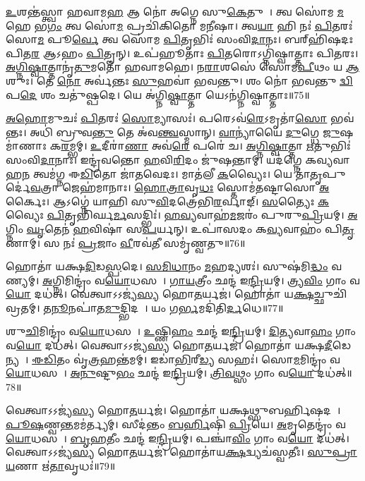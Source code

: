 \ul{𑌉}𑌶𑌨𑍍𑌤॑𑌸𑍍𑌤𑍍𑌵𑌾 𑌹𑌵𑌾𑌮\ul{𑌹} 𑌆 𑌨𑍋॑ 𑌅𑌗𑍍𑌨𑍇 𑌸𑍁\ul{𑌕𑍇}𑌤𑍁𑌨𑌾᳚।
𑌤𑍍𑌵 𑌸𑍋॑𑌮 \ul{𑌮}𑌹𑍇 𑌭\ul{𑌗𑌂} 𑌤𑍍𑌵 𑌸𑍋॑\ul{𑌮} 𑌪𑍍𑌰𑌚𑌿॑𑌕𑌿𑌤𑍋 𑌮\ul{𑌨𑍀}𑌷𑌾।
𑌤𑍍𑌵\ul{𑌯𑌾} 𑌹𑌿 𑌨𑌃॑ \ul{𑌪𑌿}𑌤𑌰𑌃॑ 𑌸𑍋\ul{𑌮} 𑌪𑍂\ul{𑌰𑍍𑌵𑍇} 𑌤𑍍𑌵 𑌸𑍋॑𑌮 \ul{𑌪𑌿}𑌤𑍃𑌭𑌿𑌃॑ 𑌸𑌂𑌵𑌿\ul{𑌦𑌾}𑌨𑌃।
𑌬𑌰𑍍‌\mbox{}𑌹𑌿॑𑌷𑌦𑌃 𑌪𑌿𑌤\ul{𑌰} 𑌆𑌽𑌹𑌂 \ul{𑌪𑌿}𑌤𑍄𑌨𑍍।
𑌉𑌪॑𑌹𑍂𑌤𑌾𑌃 \ul{𑌪𑌿}𑌤𑌰𑍋\-𑌽𑌗𑍍𑌨𑌿॑𑌷𑍍𑌵𑌾𑌤𑍍𑌤𑌾𑌃 𑌪𑌿𑌤𑌰𑌃।
\ul{𑌅}\ul{𑌗𑍍𑌨𑌿}\ul{𑌷𑍍𑌵𑌾}𑌤𑍍𑌤𑌾𑌨𑍃॑\ul{𑌤𑍁}𑌮𑌤𑍋॑ 𑌹𑌵𑌾𑌮𑌹𑍇।
𑌨\ul{𑌰𑌾}𑌶𑌸𑍇॑ 𑌸𑍋𑌮\ul{𑌪𑍀}𑌥𑌂 𑌯 \ul{𑌆}𑌶𑍁𑌃।
𑌤𑍇 \ul{𑌨𑍋} 𑌅𑌰𑍍𑌵॑𑌨𑍍𑌤𑌃 \ul{𑌸𑍁}𑌹𑌵𑌾॑ 𑌭𑌵𑌨𑍍𑌤𑍁।
𑌶𑌂 𑌨𑍋॑ 𑌭𑌵𑌨𑍍𑌤𑍁 \ul{𑌦𑍍𑌵𑌿}𑌪\ul{𑌦𑍇} 𑌶𑌂 𑌚𑌤𑍁॑𑌷𑍍𑌪𑌦𑍇।
𑌯𑍇 𑌅॑𑌗𑍍𑌨𑌿\ul{𑌷𑍍𑌵𑌾}𑌤𑍍𑌤𑌾 𑌯𑍇𑌽𑌨॑𑌗𑍍𑌨𑌿𑌷𑍍𑌵𑌾𑌤𑍍𑌤𑌾𑌃॥75॥

\ul{𑌅}\ul{}\ul{𑌹𑍋}𑌮𑍁𑌚𑌃॑ \ul{𑌪𑌿}𑌤𑌰𑌃॑ \ul{𑌸𑍋}𑌮𑍍𑌯𑌾𑌸𑌃॑।
𑌪𑌰𑍇𑌽𑌵॑\ul{𑌰𑍇}\-𑌽𑌮𑍃𑌤𑌾॑\ul{𑌸𑍋} 𑌭𑌵॑𑌨𑍍𑌤𑌃।
𑌅𑌧𑌿॑ 𑌬𑍍𑌰𑍁𑌵\ul{𑌨𑍍𑌤𑍁} 𑌤𑍇 𑌅॑𑌵\ul{𑌨𑍍𑌤𑍍𑌵}𑌸𑍍𑌮𑌾𑌨𑍍।
\ul{𑌵𑌾}𑌨𑍍𑌯𑌾॑𑌯𑍈 \ul{𑌦𑍁}𑌗𑍍𑌧𑍇 \ul{𑌜𑍁}𑌷𑌮𑌾॑𑌣𑌾𑌃 𑌕\ul{𑌰}𑌮𑍍𑌭𑌮𑍍।
\ul{𑌉}𑌦𑍀𑌰𑌾॑\ul{𑌣𑌾} 𑌅𑌵॑\ul{𑌰𑍇} 𑌪𑌰𑍇॑ 𑌚।
\ul{𑌅}\ul{𑌗𑍍𑌨𑌿}\ul{𑌷𑍍𑌵𑌾}𑌤𑍍𑌤𑌾 \ul{𑌋}𑌤𑍁𑌭𑌿𑌃॑ 𑌸𑌂𑌵𑌿\ul{𑌦𑌾}𑌨𑌾𑌃।
𑌇𑌨𑍍𑌦𑍍𑌰॑𑌵𑌨𑍍𑌤𑍋 \ul{𑌹}𑌵𑌿\ul{𑌰𑌿}𑌦𑌂 𑌜𑍁॑𑌷𑌨𑍍𑌤𑌾𑌮𑍍।
𑌯𑌦॑𑌗𑍍𑌨𑍇 𑌕𑌵𑍍𑌯𑌵𑌾𑌹\ul{𑌨} 𑌤𑍍𑌵𑌮॑𑌗𑍍𑌨 𑌈\ul{𑌡𑌿}𑌤𑍋 𑌜𑌾॑𑌤𑌵𑍇𑌦𑌃।
𑌮𑌾𑌤॑𑌲𑍀 \ul{𑌕}𑌵𑍍𑌯𑍈𑌃।
𑌯𑍇 𑌤𑌾॑\ul{𑌤𑍃}𑌪𑍁𑌰𑍍𑌦𑍇॑\ul{𑌵}𑌤𑍍𑌰𑌾 𑌜𑍇𑌹॑𑌮𑌾𑌨𑌾𑌃।
\ul{𑌹𑍋}\ul{𑌤𑍍𑌰𑌾}𑌵𑍃\ul{𑌧𑌃} 𑌸𑍍𑌤𑍋𑌮॑𑌤𑌷𑍍𑌟𑌾𑌸𑍋 \ul{𑌅}𑌰𑍍𑌕𑍈𑌃।
𑌆𑌽𑌗𑍍𑌨𑍇॑ 𑌯𑌾𑌹𑌿 𑌸𑍁\ul{𑌵𑌿}𑌦𑌤𑍍𑌰𑍇॑𑌭𑌿\ul{𑌰}𑌰𑍍𑌵𑌾𑌙𑍍।
\ul{𑌸}𑌤𑍍𑌯𑍈𑌃 \ul{𑌕}𑌵𑍍𑌯𑍈𑌃 \ul{𑌪𑌿}𑌤𑍃𑌭𑌿॑𑌰𑍍𑌘\ul{𑌰𑍍𑌮}𑌸𑌦𑍍𑌭𑌿𑌃॑।
\ul{𑌹}\ul{𑌵𑍍𑌯}𑌵𑌾𑌹॑\ul{𑌮}𑌜𑌰𑌂॑ 𑌪𑍁𑌰𑍁\ul{𑌪𑍍𑌰𑌿}𑌯𑌮𑍍।
\ul{𑌅}𑌗𑍍𑌨𑌿𑌂 \ul{𑌘𑍃}𑌤𑍇𑌨॑ \ul{𑌹}𑌵𑌿𑌷𑌾॑ 𑌸\ul{𑌪}𑌰𑍍𑌯𑌨𑍍।
𑌉𑌪𑌾॑𑌸𑌦𑌂 𑌕\ul{𑌵𑍍𑌯}𑌵𑌾𑌹𑌂॑ 𑌪𑌿\ul{𑌤𑍃}𑌣𑌾𑌮𑍍।
𑌸 𑌨𑌃॑ \ul{𑌪𑍍𑌰}𑌜𑌾𑌂 \ul{𑌵𑍀}𑌰𑌵॑\ul{𑌤𑍀}\ul{} 𑌸𑌮𑍃॑𑌣𑍍𑌵𑌤𑍁॥76॥\anuvakamend[𑌅𑌨॑𑌗𑍍𑌨𑌿𑌷𑍍𑌵𑌾\ul{𑌤𑍍𑌤𑌾} 𑌜𑍇𑌹॑𑌮𑌾𑌨𑌾𑌃 \ul{𑌸}𑌪𑍍𑌤 𑌚॑]

𑌹𑍋𑌤𑌾॑ 𑌯𑌕𑍍𑌷\ul{𑌦𑌿}𑌡\ul{𑌸𑍍𑌪}𑌦𑍇।
\ul{𑌸}\ul{𑌮𑌿}\ul{𑌧𑌾}𑌨𑌂 \ul{𑌮}𑌹𑌦𑍍𑌯𑌶𑌃॑।
𑌸𑍁𑌷॑𑌮𑌿\ul{𑌦𑍍𑌧𑌂} 𑌵𑌰𑍇᳚𑌣𑍍𑌯𑌮𑍍।
\ul{𑌅}𑌗𑍍𑌨𑌿𑌮𑌿𑌨𑍍𑌦𑍍𑌰𑌂॑ 𑌵\ul{𑌯𑍋}𑌧𑌸𑌮𑍍᳚।
\ul{𑌗𑌾}\ul{𑌯}𑌤𑍍𑌰𑍀𑌂 𑌛𑌨𑍍𑌦॑ 𑌇\ul{𑌨𑍍𑌦𑍍𑌰𑌿}𑌯𑌮𑍍।
𑌤𑍍𑌰𑍍𑌯\ul{𑌵𑌿𑌂} 𑌗𑌾𑌂 𑌵\ul{𑌯𑍋} 𑌦𑌧॑𑌤𑍍।
𑌵𑍇𑌤𑍍𑌵𑌾𑌽𑌽𑌜𑍍𑌯॑\ul{𑌸𑍍𑌯} 𑌹𑍋\ul{𑌤}𑌰𑍍𑌯𑌜॑।
𑌹𑍋𑌤𑌾॑ 𑌯\ul{𑌕𑍍𑌷}𑌚𑍍𑌛𑍁𑌚𑌿॑𑌵𑍍𑌰𑌤𑌮𑍍।
𑌤\ul{𑌨𑍂}𑌨𑌪𑌾॑𑌤\ul{𑌮𑍁}𑌦𑍍𑌭𑌿𑌦𑌮𑍍᳚।
𑌯𑌂 𑌗\ul{𑌰𑍍𑌭}𑌮𑌦𑌿॑𑌤𑌿\ul{𑌰𑍍𑌦}𑌧𑍇॥77॥

𑌶𑍁\ul{𑌚𑌿}𑌮𑌿𑌨𑍍𑌦𑍍𑌰𑌂॑ 𑌵\ul{𑌯𑍋}𑌧𑌸𑌮𑍍᳚।
\ul{𑌉}𑌷𑍍𑌣𑌿\ul{𑌹𑌂} 𑌛𑌨𑍍𑌦॑ 𑌇\ul{𑌨𑍍𑌦𑍍𑌰𑌿}𑌯𑌮𑍍।
\ul{𑌦𑌿}\ul{𑌤𑍍𑌯}𑌵𑌾\ul{𑌹𑌂} 𑌗𑌾𑌂 𑌵\ul{𑌯𑍋} 𑌦𑌧॑𑌤𑍍।
𑌵𑍇𑌤𑍍𑌵𑌾𑌽𑌽𑌜𑍍𑌯॑\ul{𑌸𑍍𑌯} 𑌹𑍋\ul{𑌤}𑌰𑍍𑌯𑌜॑।
𑌹𑍋𑌤𑌾॑ 𑌯𑌕𑍍𑌷\ul{𑌦𑍀}𑌡𑍇𑌨𑍍𑌯𑌮𑍍᳚।
\ul{𑌈}\ul{𑌡𑌿}𑌤𑌂 𑌵𑍃॑\ul{𑌤𑍍𑌰}𑌹𑌨𑍍𑌤॑𑌮𑌮𑍍।
𑌇𑌡𑌾॑\ul{𑌭𑌿}𑌰𑍀\ul{𑌡𑍍𑌯}\ul{} 𑌸𑌹𑌃॑।
𑌸𑍋\ul{𑌮}𑌮𑌿𑌨𑍍𑌦𑍍𑌰𑌂॑ 𑌵\ul{𑌯𑍋}𑌧𑌸𑌮𑍍᳚।
\ul{𑌅}\ul{𑌨𑍁}𑌷𑍍𑌟𑍁\ul{𑌭𑌂} 𑌛𑌨𑍍𑌦॑ 𑌇\ul{𑌨𑍍𑌦𑍍𑌰𑌿}𑌯𑌮𑍍।
\ul{𑌤𑍍𑌰𑌿}\ul{𑌵}𑌥𑍍𑌸𑌂 𑌗𑌾𑌂 𑌵\ul{𑌯𑍋} 𑌦𑌧॑𑌤𑍍॥78॥

𑌵𑍇𑌤𑍍𑌵𑌾𑌽𑌽𑌜𑍍𑌯॑\ul{𑌸𑍍𑌯} 𑌹𑍋\ul{𑌤}𑌰𑍍𑌯𑌜॑।
𑌹𑍋𑌤𑌾॑ 𑌯𑌕𑍍𑌷𑌥𑍍𑌸𑍁𑌬𑌰𑍍\mbox{}\ul{𑌹𑌿}𑌷𑌦𑌮𑍍᳚।
\ul{𑌪𑍂}\ul{𑌷}𑌣𑍍𑌵\ul{𑌨𑍍𑌤}𑌮𑌮॑𑌰𑍍𑌤𑍍𑌯𑌮𑍍।
𑌸𑍀𑌦॑𑌨𑍍𑌤𑌂 \ul{𑌬}\ul{𑌰𑍍}𑌹𑌿𑌷𑌿॑ \ul{𑌪𑍍𑌰𑌿}𑌯𑍇।
\ul{𑌅}𑌮𑍃𑌤𑍇𑌨𑍍𑌦𑍍𑌰𑌂॑ 𑌵\ul{𑌯𑍋}𑌧𑌸𑌮𑍍᳚।
\ul{𑌬𑍃}\ul{𑌹}𑌤𑍀𑌂 𑌛𑌨𑍍𑌦॑ 𑌇\ul{𑌨𑍍𑌦𑍍𑌰𑌿}𑌯𑌮𑍍।
𑌪𑌞𑍍𑌚𑌾॑\ul{𑌵𑌿𑌂} 𑌗𑌾𑌂 𑌵\ul{𑌯𑍋} 𑌦𑌧॑𑌤𑍍।
𑌵𑍇𑌤𑍍𑌵𑌾𑌽𑌽𑌜𑍍𑌯॑\ul{𑌸𑍍𑌯} 𑌹𑍋\ul{𑌤}𑌰𑍍𑌯𑌜॑।
𑌹𑍋𑌤𑌾॑𑌯\ul{𑌕𑍍𑌷}𑌦𑍍𑌵𑍍𑌯𑌚॑𑌸𑍍𑌵𑌤𑍀𑌃।
\ul{𑌸𑍁}\ul{𑌪𑍍𑌰𑌾}\ul{𑌯}𑌣𑌾 𑌋॑\ul{𑌤𑌾}𑌵𑍃𑌧𑌃॑॥79॥

